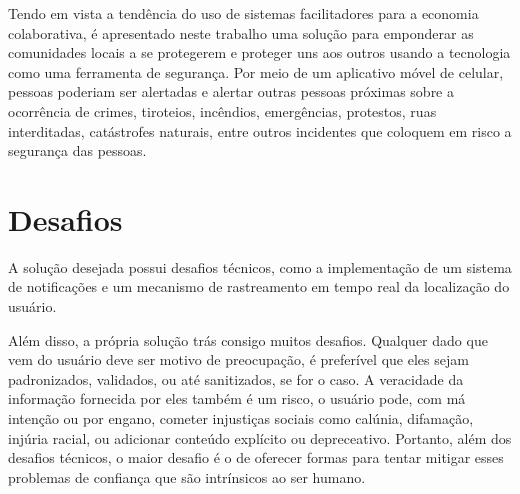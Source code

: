 Tendo em vista a tendência do uso de sistemas facilitadores para a economia colaborativa, é apresentado neste trabalho uma solução para emponderar as comunidades locais a se protegerem e proteger uns aos outros usando a tecnologia como uma ferramenta de segurança. Por meio de um aplicativo móvel de celular, pessoas poderiam ser alertadas e alertar outras pessoas próximas sobre a ocorrência de crimes, tiroteios, incêndios, emergências, protestos, ruas interditadas, catástrofes naturais, entre outros incidentes que coloquem em risco a segurança das pessoas.

\section{Desafios}
\label{s.desafios}

A solução desejada possui desafios técnicos, como a implementação de um sistema de notificações e um mecanismo de rastreamento em tempo real da localização do usuário.

Além disso, a própria solução trás consigo muitos desafios. Qualquer dado que vem do usuário deve ser motivo de preocupação, é preferível que eles sejam padronizados, validados, ou até sanitizados, se for o caso. A veracidade da informação fornecida por eles também é um risco, o usuário pode, com má intenção ou por engano, cometer injustiças sociais como calúnia, difamação, injúria racial, ou adicionar conteúdo explícito ou depreceativo. Portanto, além dos desafios técnicos, o maior desafio é o de oferecer formas para tentar mitigar esses problemas de confiança que são intrínsicos ao ser humano.

